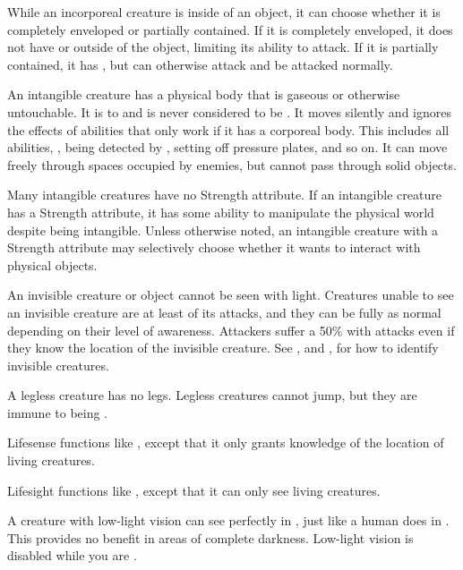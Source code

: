   While an incorporeal creature is inside of an object, it can choose whether it is completely enveloped or partially contained.
  If it is completely enveloped, it does not have  or  outside of the object, limiting its ability to attack.
  If it is partially contained, it has , but can otherwise attack and be attacked normally.

  An intangible creature has a physical body that is gaseous or otherwise untouchable.
  It is  to  and is never considered to be \squeezing.
  It moves silently and ignores the effects of abilities that only work if it has a corporeal body.
  This includes all  abilities, , being detected by , setting off pressure plates, and so on.
  It can move freely through spaces occupied by enemies, but cannot pass through solid objects.

  Many intangible creatures have no Strength attribute.
  If an intangible creature has a Strength attribute, it has some ability to manipulate the physical world despite being intangible.
  Unless otherwise noted, an intangible creature with a Strength attribute may selectively choose whether it wants to interact with physical objects.

  An invisible creature or object cannot be seen with light.
  Creatures unable to see an invisible creature are at least \partiallyunaware of its attacks, and they can be fully \unaware as normal depending on their level of awareness.
  Attackers suffer a 50\%  with  attacks even if they know the location of the invisible creature.
  See , and , for how to identify invisible creatures.

  A legless creature has no legs.
  Legless creatures cannot jump, but they are immune to being \prone.

  Lifesense functions like , except that it only grants knowledge of the location of living creatures.

  Lifesight functions like , except that it can only see living creatures.

  A creature with low-light vision can see perfectly in , just like a human does in .
  This provides no benefit in areas of complete darkness.
  Low-light vision is disabled while you are \dazzled.

